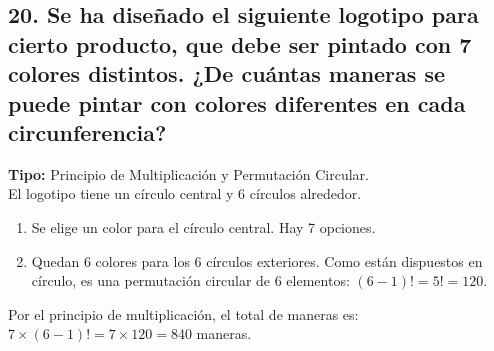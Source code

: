 \documentclass[11pt]{article}
\begin{document}
    \subsection*{20. Se ha diseñado el siguiente logotipo para cierto producto, que debe ser pintado con 7 colores distintos. ¿De cuántas maneras se puede pintar con colores diferentes en cada circunferencia?}
    \textbf{Tipo:} Principio de Multiplicación y Permutación Circular. \\
    El logotipo tiene un círculo central y 6 círculos alrededor.
    \begin{enumerate}
        \item Se elige un color para el círculo central. Hay 7 opciones.
        \item Quedan 6 colores para los 6 círculos exteriores. Como están dispuestos en círculo, es una permutación circular de 6 elementos: $(6-1)! = 5! = 120$.
    \end{enumerate}
    Por el principio de multiplicación, el total de maneras es: $7 \times (6-1)! = 7 \times 120 = 840$ maneras.
    
\end{document}
